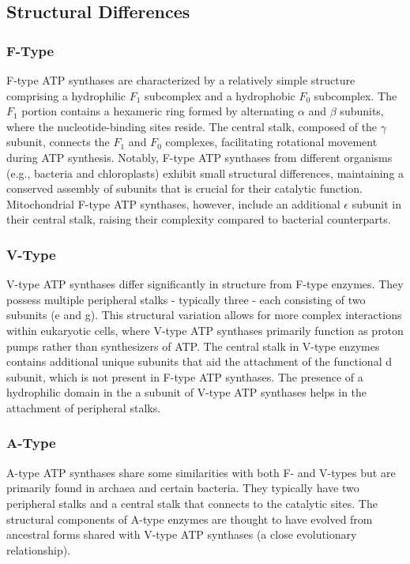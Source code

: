 \documentclass{article}
\begin{document}
\subsection{Structural Differences}

\subsubsection{F-Type}

F-type ATP synthases are characterized by a relatively simple structure comprising a hydrophilic \textit{$F_1$} subcomplex and a hydrophobic \textit{$F_0$} subcomplex. The \textit{$F_1$} portion contains a hexameric ring formed by alternating $\alpha$ and $\beta$ subunits, where the nucleotide-binding sites reside. The central stalk, composed of the $\gamma$ subunit, connects the \textit{$F_1$} and \textit{$F_0$} complexes, facilitating rotational movement during ATP synthesis. Notably, F-type ATP synthases from different organisms (e.g., bacteria and chloroplasts) exhibit small structural differences, maintaining a conserved assembly of subunits that is crucial for their catalytic function. Mitochondrial F-type ATP synthases, however, include an additional $\epsilon$ subunit in their central stalk, raising their complexity compared to bacterial counterparts.

\subsubsection{V-Type}

V-type ATP synthases differ significantly in structure from F-type enzymes. They possess multiple peripheral stalks - typically three - each consisting of two subunits (e and g). This structural variation allows for more complex interactions within eukaryotic cells, where V-type ATP synthases primarily function as proton pumps rather than synthesizers of ATP. The central stalk in V-type enzymes contains additional unique subunits that aid the attachment of the functional d subunit, which is not present in F-type ATP synthases. The presence of a hydrophilic domain in the a subunit of V-type ATP synthases helps in the attachment of peripheral stalks.

\subsubsection{A-Type}

A-type ATP synthases share some similarities with both F- and V-types but are primarily found in archaea and certain bacteria. They typically have two peripheral stalks and a central stalk that connects to the catalytic sites. The structural components of A-type enzymes are thought to have evolved from ancestral forms shared with V-type ATP synthases (a close evolutionary relationship).
\end{document}

